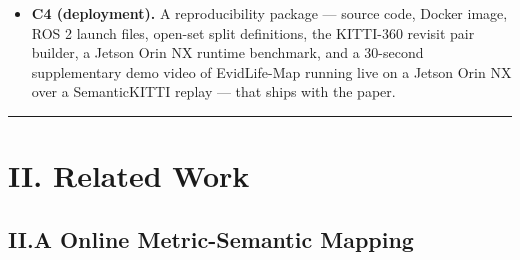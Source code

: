 \documentclass[
]{article}
\begin{document}
\begin{itemize}
  0.76 + ECE 0.32) is the first reported demonstration that one shipped
  EDL-MSM model serves all four perception jobs simultaneously. RQ5 also
  gives the first published head-to-head between an implicit-vacuity
  dynamic-handling mechanism and Khronos\textquotesingle s explicit
  short-/long-term factoriser on a public dynamic split.
\item
  \textbf{C4 (deployment).} A reproducibility package --- source code,
  Docker image, ROS 2 launch files, open-set split definitions, the
  KITTI-360 revisit pair builder, a Jetson Orin NX runtime benchmark,
  and a 30-second supplementary demo video of EvidLife-Map running live
  on a Jetson Orin NX over a SemanticKITTI replay --- that ships with
  the paper.
\end{itemize}

\begin{center}\rule{0.5\linewidth}{0.5pt}\end{center}

\section{II. Related Work}\label{ii-related-work}

\subsection{II.A Online Metric-Semantic
Mapping}\label{iia-online-metric-semantic-mapping}
\end{document}

